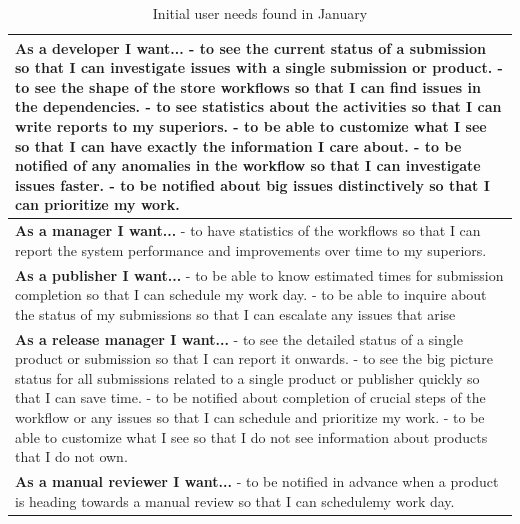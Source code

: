 \begin{table}[htb]
\begin{center}
\begin{tabularx}{\linewidth}{| X |}
\hline

\textbf{As a developer I want...} \newline
- to see the current status of a submission so that I can investigate issues with a single submission or product.\newline
- to see the shape of the store workflows so that I can find issues in the dependencies.\newline
- to see statistics about the activities so that I can write reports to my superiors.\newline
- to be able to customize what I see so that I can have exactly the information I care about.\newline
- to be notified of any anomalies in the workflow so that I can investigate issues faster.\newline
- to be notified about big issues distinctively so that I can prioritize my work.
\\
\hline

\textbf{As a manager I want...} \newline
- to have statistics of the workflows so that I can report the system performance and improvements over time to my superiors.
\\
\hline

\textbf{As a publisher I want...} \newline
- to be able to know estimated times for submission completion so that I can schedule my work day.\newline
- to be able to inquire about the status of my submissions so that I can escalate any issues that arise
\\
\hline

\textbf{As a release manager I want...} \newline
- to see the detailed status of a single product or submission so that I can report it onwards. \newline
- to see the big picture status for all submissions related to a single product or publisher quickly so that I can save time. \newline
- to be notified about completion of crucial steps of the workflow or any issues so that I can schedule and prioritize my work. \newline
- to be able to customize what I see so that I do not see information about products that I do not own.
\\
\hline

\textbf{As a manual reviewer I want...} \newline
- to be notified in advance when a product is heading towards a manual review so that I can schedulemy work day.
\\
\hline

\end{tabularx}
\end{center}
\caption{Initial user needs found in January}
\label{tab:userneeds}
\end{table}

